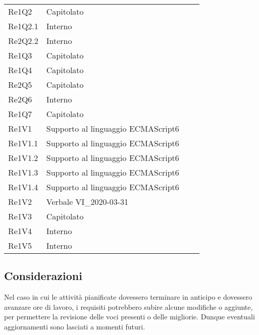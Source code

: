 \begin{longtable}{C{3cm} C{3cm} L{5.5cm} C{3cm}}
Re1Q2 & Capitolato\\
Re1Q2.1 & Interno\\
Re2Q2.2 & Interno\\
Re1Q3 & Capitolato\\
Re1Q4 & Capitolato\\
Re2Q5 & Capitolato\\
Re2Q6 & Interno\\
Re1Q7 & Capitolato\\
Re1V1 & Supporto al linguaggio ECMAScript6\\
Re1V1.1 & Supporto al linguaggio ECMAScript6\\
Re1V1.2 & Supporto al linguaggio ECMAScript6\\
Re1V1.3 & Supporto al linguaggio ECMAScript6\\
Re1V1.4 & Supporto al linguaggio ECMAScript6\\
Re1V2 & Verbale VI\_2020-03-31\\
Re1V3 & Capitolato\\
Re1V4 & Interno\\
Re1V5 & Interno\\
\end{longtable}
	

	\subsection{Considerazioni}
Nel caso in cui le attività pianificate dovessero terminare in anticipo e dovessero avanzare ore di lavoro, i requisiti potrebbero subire alcune modifiche o aggiunte, per permettere la revisione delle voci presenti o delle migliorie. Dunque eventuali aggiornamenti sono lasciati a momenti
futuri.


